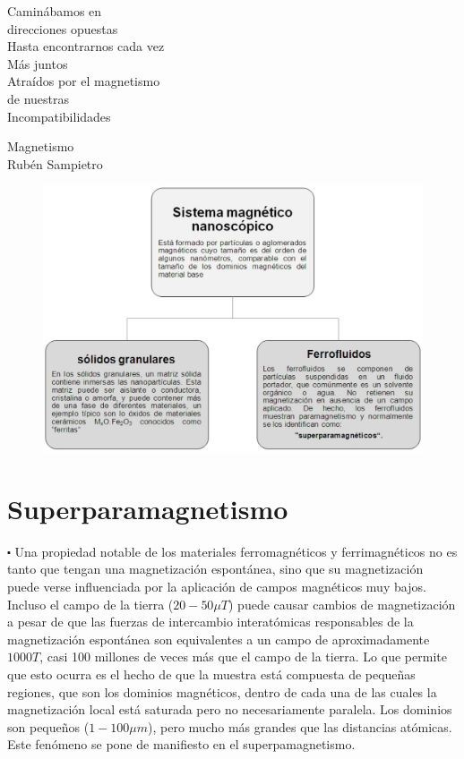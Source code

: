 \vspace{10mm}

\begin{center}
Caminábamos en\\
direcciones opuestas\\
Hasta encontrarnos cada vez\\
Más juntos\\
Atraídos por el magnetismo\\
de nuestras\\
Incompatibilidades

\hspace{4.0cm} Magnetismo\\
\hspace{3.2cm} Rubén Sampietro  
\end{center}

\begin{figure}[H]
    \centering
    \includegraphics[width=1.19\textwidth]{./Figures/fig32}
\end{figure}


\section{Superparamagnetismo}

$\centerdot$ Una propiedad notable de los materiales ferromagnéticos y ferrimagnéticos no es tanto que tengan una magnetización espontánea, sino que su magnetización puede verse influenciada por la aplicación de campos magnéticos muy bajos. Incluso el campo de la tierra ($20-50 \mu T$) puede causar cambios de magnetización a pesar de que las fuerzas de intercambio interatómicas responsables de la magnetización espontánea son equivalentes a un campo de aproximadamente $1000 T$, casi 100 millones de veces más que el campo de la tierra. Lo que permite que esto ocurra es el hecho de que la muestra está compuesta de pequeñas regiones, que son los dominios magnéticos, dentro de cada una de las cuales la magnetización local está saturada pero no necesariamente paralela. Los dominios son pequeños ($1-100 \mu m$), pero mucho más grandes que las distancias atómicas. Este fenómeno se pone de manifiesto en el superpamagnetismo.

